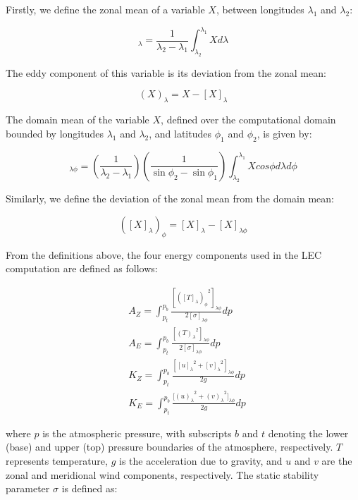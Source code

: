 \documentclass[pdflatex,sn-chicago]{sn-jnl}%
\theoremstyle{plain}
\theoremstyle{definition}
\theoremstyle{remark}
\theoremstyle{definition}
\begin{document}
Firstly, we define the zonal mean of a variable $X$, between longitudes $\lambda_{1}$ and $\lambda_{2}$:

 \begin{equation}
     [X]_\lambda = \frac{1}{\lambda_2 - \lambda_1} \int_{\lambda_2}^{\lambda_1} X d\lambda
 \end{equation}

The eddy component of this variable is its deviation from the zonal mean:

\begin{equation}
    (X)_\lambda =  X - [X]_\lambda
\end{equation}

The domain mean of the variable $X$, defined over the computational domain bounded by longitudes $\lambda_1$ and $\lambda_2$, and latitudes $\phi_1$ and $\phi_2$, is given by:

\begin{equation}
    [X]_{\lambda\phi} = \left(\frac{1}{\lambda_2 - \lambda_1}\right)  \left(\frac{1}{\sin\phi_2 - \sin\phi_1}\right) \int_{\lambda_2}^{\lambda_1} X cos\phi d\lambda d\phi 
\end{equation}

Similarly, we define the deviation of the zonal mean from the domain mean:

\begin{equation}
    ([X]_\lambda)_\phi = [X]_\lambda - [X]_{\lambda\phi}
\end{equation}

From the definitions above, the four energy components used in the LEC computation are defined as follows:

\begin{align}
   &A_Z = \int_{p_t}^{p_b} \frac{[{([T]_\lambda)_\phi}^{2}]_{\lambda \phi}}  {2[\sigma]_{\lambda \phi}} dp \label{eq:AZ} \\
   &A_E = \int_{p_t}^{p_b} \frac{[{(T)_\lambda}^{2}]_{\lambda \phi}}  {2[\sigma]_{\lambda \phi}} dp \label{eq:AE} \\
   &K_Z =  \int_{p_t}^{p_b} \frac{[{[u]_\lambda}^2 + {[v]_\lambda}^2]_{\lambda \phi}}{2g} dp \label{eq:KZ} \\
   &K_E =  \int_{p_t}^{p_b} \frac{{[(u)_\lambda}^2 + {(v)_\lambda}^2]_{\lambda \phi}}{2g} dp \label{eq:KE}
\end{align}

where $p$ is the atmospheric pressure, with subscripts $b$ and $t$ denoting the lower (base) and upper (top) pressure boundaries of the atmosphere, respectively. $T$ represents temperature, $g$ is the acceleration due to gravity, and $u$ and $v$ are the zonal and meridional wind components, respectively. The static stability parameter $\sigma$ is defined as:
\end{document}

